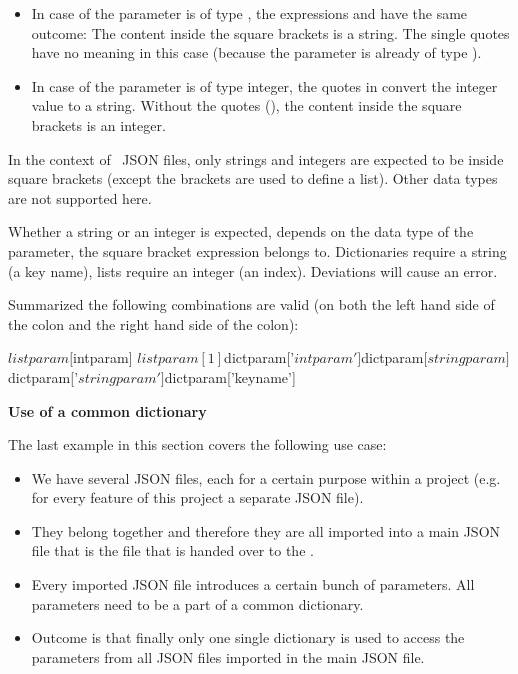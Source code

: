 \begin{itemize}
   \item In case of the parameter  is of type , the expressions \pcode{[$\{param\}]} and \pcode{['$\{param\}']} have the same outcome:
         The content inside the square brackets is a string. The single quotes have no meaning in this case (because the parameter is already of type ).
   \item In case of the parameter  is of type integer, the quotes in \pcode{['$\{param\}']} convert the integer value to a string.
         Without the quotes (\pcode{[$\{param\}]}), the content inside the square brackets is an integer.
\end{itemize}

In the context of \pkg\ JSON files, only strings and integers are expected to be inside square brackets (except the brackets are used to define a list).
Other data types are not supported here.

Whether a string or an integer is expected, depends on the data type of the parameter, the square bracket expression belongs to. Dictionaries require a string (a key name), lists require an integer (an index).
Deviations will cause an error.

Summarized the following combinations are valid (on both the left hand side of the colon and the right hand side of the colon):

\begin{pythoncode}
${listparam}[${intparam}]
${listparam}[1]
${dictparam}['${intparam}']
${dictparam}[${stringparam}]
${dictparam}['${stringparam}']
${dictparam}['keyname']
\end{pythoncode}

\vspace{2ex}

\textbf{Use of a common dictionary}

The last example in this section covers the following use case:

\begin{itemize}
   \item We have several JSON files, each for a certain purpose within a project (e.g. for every feature of this project a separate JSON file).
   \item They belong together and therefore they are all imported into a main JSON file that is the file that is handed over to the \pkg.
   \item Every imported JSON file introduces a certain bunch of parameters. All parameters need to be a part of a common dictionary.
   \item Outcome is that finally only one single dictionary is used to access the parameters from all JSON files imported in the main JSON file.
\end{itemize}

